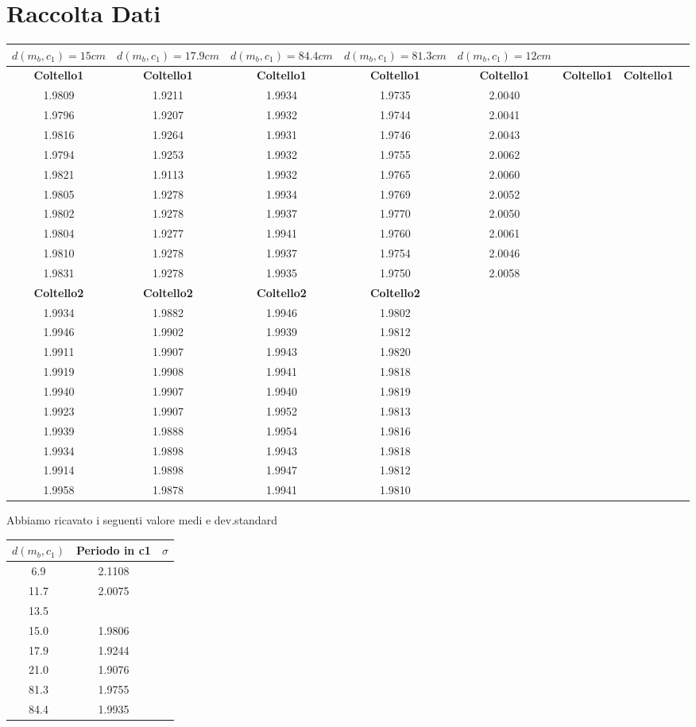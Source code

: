 \documentclass[a4paper,10pt]{report}
\begin{document}
\section{Raccolta Dati}
\begin{tabular}{*{8}{|c}}
\textbf{$d(m_b,c_1)=15cm$} & \textbf{$d(m_b,c_1)=17.9cm$} & \textbf{$d(m_b,c_1)=84.4cm$}& \textbf{$d(m_b,c_1)=81.3cm$}& \textbf{$d(m_b,c_1)=12cm$}\\
\midrule
 \textbf{Coltello1}&\textbf{Coltello1}&\textbf{Coltello1}&\textbf{Coltello1}&\textbf{Coltello1}&\textbf{Coltello1}&\textbf{Coltello1}\\
 1.9809 & 1.9211 & 1.9934 & 1.9735 & 2.0040\\
 1.9796 & 1.9207 & 1.9932 & 1.9744 & 2.0041\\
 1.9816 & 1.9264 & 1.9931 & 1.9746 & 2.0043\\
 1.9794 & 1.9253 & 1.9932 & 1.9755 & 2.0062\\
 1.9821 & 1.9113 & 1.9932 & 1.9765 & 2.0060\\
 1.9805 & 1.9278 & 1.9934 & 1.9769 & 2.0052\\
 1.9802 & 1.9278 & 1.9937 & 1.9770 & 2.0050\\
 1.9804 & 1.9277 & 1.9941 & 1.9760 & 2.0061\\
 1.9810 & 1.9278 & 1.9937 & 1.9754 & 2.0046\\
 1.9831 & 1.9278 & 1.9935 & 1.9750 & 2.0058\\

 \textbf{Coltello2}&\textbf{Coltello2}&\textbf{Coltello2}&\textbf{Coltello2}\\
 1.9934 & 1.9882 & 1.9946 &	1.9802 & \\
 1.9946 & 1.9902 & 1.9939 &	1.9812\\
 1.9911 & 1.9907 & 1.9943 &	1.9820\\
 1.9919 & 1.9908 & 1.9941 &	1.9818\\
 1.9940 & 1.9907 & 1.9940 &	1.9819\\
 1.9923 & 1.9907 & 1.9952 &	1.9813\\
 1.9939 & 1.9888 & 1.9954 &	1.9816\\
 1.9934 & 1.9898 & 1.9943 &	1.9818\\
 1.9914 & 1.9898 & 1.9947 &	1.9812\\
 1.9958 & 1.9878 & 1.9941 &	1.9810\\
 
 
\end{tabular}

Abbiamo ricavato i seguenti valore medi e dev.standard 
\begin{tabular}{|c|c|c|}
$d(m_b,c_1)$ & Periodo in c1 & $\sigma$ \\
\midrule
6.9 & 2.1108 &\\
11.7 & 2.0075 &\\
13.5 & &\\
15.0 &  1.9806 &\\
17.9 & 1.9244 &\\
21.0 & 1.9076 &\\
81.3 & 1.9755&\\
84.4 & 1.9935&\\
\end{tabular}
\end{document}
